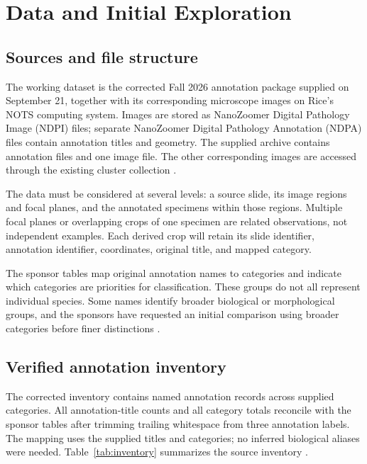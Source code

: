 \documentclass[11pt,letterpaper]{article}
\begin{document}
\section{Data and Initial Exploration}
\subsection{Sources and file structure}
The working dataset is the corrected Fall 2026 annotation package supplied on September 21, together with its corresponding microscope images on Rice's NOTS computing system. Images are stored as NanoZoomer Digital Pathology Image (NDPI) files; separate NanoZoomer Digital Pathology Annotation (NDPA) files contain annotation titles and geometry. The supplied archive contains \SlideCount{} annotation files and one image file. The other corresponding images are accessed through the existing cluster collection \citep{inventory2026}.

The data must be considered at several levels: a source slide, its image regions and focal planes, and the annotated specimens within those regions. Multiple focal planes or overlapping crops of one specimen are related observations, not independent examples. Each derived crop will retain its slide identifier, annotation identifier, coordinates, original title, and mapped category.

The sponsor tables map original annotation names to categories and indicate which categories are priorities for classification. These groups do not all represent individual species. Some names identify broader biological or morphological groups, and the sponsors have requested an initial comparison using broader categories before finer distinctions \citep{meeting2026}.

\subsection{Verified annotation inventory}
The corrected inventory contains \NamedCount{} named annotation records across \CategoryCount{} supplied categories. All \TitleCount{} annotation-title counts and all category totals reconcile with the sponsor tables after trimming trailing whitespace from three annotation labels. The mapping uses the supplied titles and categories; no inferred biological aliases were needed. Table~\ref{tab:inventory} summarizes the source inventory \citep{inventory2026}.
\end{document}
